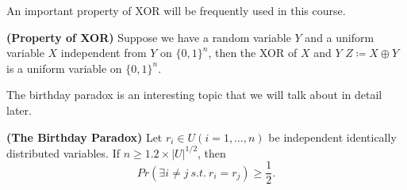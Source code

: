 An important property of XOR will be frequently used in this course.
\begin{theorem}\textbf{(Property of XOR)}
Suppose we have a random variable $Y$ and a uniform variable $X$ independent from $Y$ on $\{0,1\}^n$, then the XOR of $X$ and $Y$ $Z\coloneqq X\oplus Y$ is a uniform variable on $\{0,1\}^n$.
\end{theorem}

The birthday paradox is an interesting topic that we will talk about in detail later.
\begin{theorem}\textbf{(The Birthday Paradox)}
Let $r_i\in U(i=1,\dots,n)$ be independent identically distributed variables. If $n\geq 1.2\times\lvert U\rvert^{1/2}$, then $$Pr(\exists i\neq j\:s.t.\:r_i=r_j)\geq\frac{1}{2}.$$
\end{theorem}
\ifx\PREAMBLE\undefined

\fi